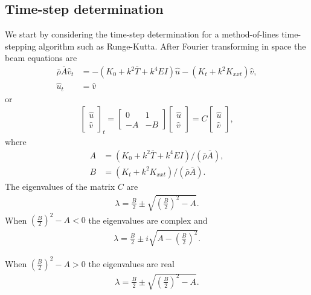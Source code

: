 \documentclass[11pt]{article}
\newcommand{\rhos}{\bar{\rho}}
\newcommand{\As}{\bar{A}}
\newcommand{\Ts}{\bar{T}}
\begin{document}
\newcommand{\uHat}{\hat{u}}
\newcommand{\vHat}{\hat{v}}
\newcommand{\Ahat}{\hat{A}}
\newcommand{\Bhat}{\hat{B}}
\newcommand{\lambdaHat}{\hat{\lambda}}
\subsection{Time-step determination}


We start by considering the time-step determination for a method-of-lines time-stepping
algorithm such as Runge-Kutta.
After Fourier transforming in space the beam equations are
\begin{align*}
 \rhos\As \vHat_{t} &= - (K_0 + k^2\Ts + k^4 E I )\uHat - (K_t+ k^2 K_{xxt}) \vHat, \\
  \uHat_t &= \vHat
\end{align*}
or
\begin{align*}
 \begin{bmatrix} \uHat\\ \vHat \end{bmatrix}_t = 
      \begin{bmatrix}
            0 & 1 \\
           -A & -B
      \end{bmatrix}
 \begin{bmatrix} \uHat\\ \vHat\end{bmatrix}     = C \begin{bmatrix} \uHat\\ \vHat\end{bmatrix} , 
\end{align*}
where
\begin{align*}
  A &= (K_0 + k^2\Ts + k^4 E I)/(\rhos\As), \\
  B &= (K_t+ k^2 K_{xxt})/(\rhos\As). 
\end{align*}
The eigenvalues of the matrix $C$ are 
\begin{align*}
  \lambda = \frac{B}{2} \pm \sqrt{ \left(\frac{B}{2}\right)^2 - A} .
\end{align*}
 When $\left(\frac{B}{2}\right)^2 - A <0$ the eigenvalues are complex and
\begin{align*}
  \lambda = \frac{B}{2} \pm i \sqrt{ A - \left(\frac{B}{2}\right)^2} .
\end{align*}

 When $\left(\frac{B}{2}\right)^2 - A >0$ the eigenvalues are real
\begin{align*}
  \lambda = \frac{B}{2} \pm \sqrt{ \left(\frac{B}{2}\right)^2 - A}.
\end{align*}
\end{document}
